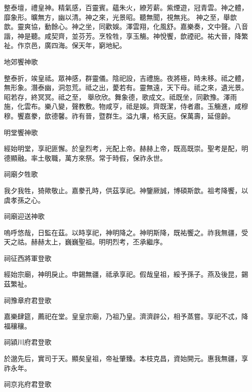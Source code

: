 \begin{pinyinscope}
 整泰壇，禮皇神。精氣感，百靈賓。蘊朱火，繚芳薪。紫煙遊，冠青雲。神之體，靡象形。曠無方，幽以清。神之來，光景昭。聽無聞，視無兆。
 神之至，舉歆歆。靈爽協，動餘心。神之坐，同歡娛。澤雲翔，化風舒。嘉樂奏，文中聲。八音諧，神是聽。咸契齊，並芬芳。烹牷牲，享玉觴。神悅饗，歆禋祀。祐大晉，降繁祉。作京邑，廣四海。保天年，窮地紀。



 地郊饗神歌



 整泰折，竢皇祗。眾神感，群靈儀。陰祀設，吉禮施。夜將極，時未移。祗之體，無形象。潛泰幽，洞忽荒。祗之出，薆若有。靈無遠，天下母。祗之來，遺光景。昭若存，終冥冥。祗之至，
 舉欣欣。舞象德，歌成文。祗既坐，同歡豫。澤雨施，化雲布。樂八變，聲教敷。物咸亨，祗是娛。齊既潔，侍者肅。玉觴進，咸穆穆。饗嘉豢，歆德馨。祚有晉，暨群生。溢九壤，格天庭。保萬壽，延億齡。



 明堂饗神歌



 經始明堂，享祀匪懈。於皇烈考，光配上帝。赫赫上帝，既高既崇。聖考是配，明德顯融。率土敬職，萬方來祭。常于時假，保祚永世。



 祠廟夕牲歌



 我夕我牲，猗歟敬止。嘉豢孔時，供茲享祀。神鑒厥誠，博碩斯歆。祖考降饗，以虞孝孫之心。



 祠廟迎送神歌



 嗚呼悠哉，日監在茲。以時享祀，神明降之。神明斯降，既祐饗之。祚我無疆，受天之祜。赫赫太上，巍巍聖祖。明明烈考，丕承繼序。



 祠征西將軍登歌



 經始宗廟，神明戾止。申錫無疆，祗承享祀。假哉皇祖，綏予孫子。燕及後昆，錫茲繁祉。



 祠豫章府君登歌



 嘉樂肆筵，薦祀在堂。皇皇宗廟，乃祖乃皇。濟濟辟公，相予蒸嘗。享祀不忒，降福穰穰。



 祠潁川府君登歌



 於邈先后，實司于天。顯矣皇祖，帝祉肇臻。本枝克昌，資始開元。惠我無疆，享祚永年。



 祠京兆府君登歌




\end{pinyinscope}
